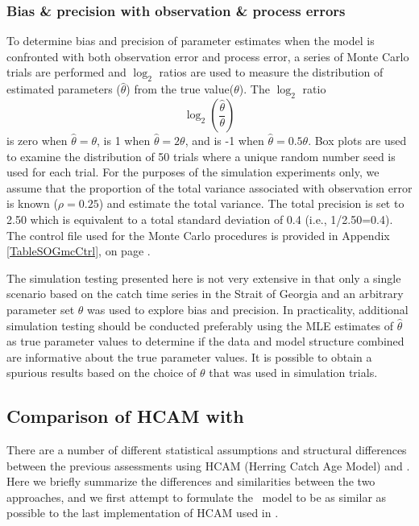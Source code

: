 		
		\subsubsection{Bias \& precision with observation \& process errors}
To determine bias and precision of parameter estimates when the model is confronted with both observation error and process error, a series of Monte Carlo trials are performed and $\log_2$ ratios are used to measure the distribution of estimated parameters ($\hat{\theta}$) from the true value($\theta$).  The $\log_2$ ratio
\[ \log_2\left(\frac{\hat{\theta}}{\theta}\right) \] is zero when $\hat{\theta}=\theta$, is 1 when $\hat{\theta}=2\theta$, and is -1 when $\hat{\theta}=0.5\theta$.  Box plots are used to examine the distribution of 50 trials where a unique random number seed is used for each trial.  For the purposes of the simulation experiments only, we assume that the proportion of the total variance associated with observation error is known ($\rho = 0.25$) and estimate the total variance.  The total precision is set to 2.50 which is equivalent to a total standard deviation of 0.4 (i.e., 1/2.50=0.4).  The control file used for the Monte Carlo procedures is provided in Appendix \ref{TableSOGmcCtrl}, on page \pageref{TableSOGmcCtrl}.

The simulation testing presented here is not very extensive in that only a single scenario based on the catch time series in the Strait of Georgia and an arbitrary parameter set $\theta$ was used to explore bias and precision.  In practicality, additional simulation testing should be conducted preferably using the MLE estimates of $\hat{\theta}$ as true parameter values to determine if the data and model structure combined are informative about the true parameter values.  It is possible to obtain a spurious results based on the choice of $\theta$ that was used in simulation trials.


\subsection{Comparison of HCAM with \iscam}\label{secMethodsHCAM}
	
	There are a number of different statistical assumptions and structural differences between the previous assessments using HCAM (Herring Catch Age Model) and \iscam.	  Here we briefly summarize the differences and similarities between the two approaches, and we first attempt to formulate the \iscam\ model to be as similar as possible to the last implementation of HCAM used in \cite{Clear2010}.
	
